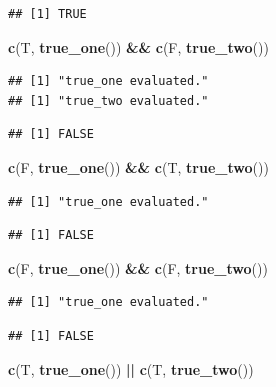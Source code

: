 \documentclass[]{book}
\newenvironment{Shaded}{\begin{snugshade}}{\end{snugshade}}
\newcommand{\KeywordTok}[1]{\textcolor[rgb]{0.13,0.29,0.53}{\textbf{#1}}}
\newcommand{\NormalTok}[1]{#1}
\newcommand{\OperatorTok}[1]{\textcolor[rgb]{0.81,0.36,0.00}{\textbf{#1}}}
\newcommand{\StringTok}[1]{\textcolor[rgb]{0.31,0.60,0.02}{#1}}
\begin{document}
\begin{verbatim}
## [1] TRUE
\end{verbatim}

\begin{Shaded}
\begin{Highlighting}[]
\KeywordTok{c}\NormalTok{(T, }\KeywordTok{true_one}\NormalTok{()) }\OperatorTok{&&}\StringTok{ }\KeywordTok{c}\NormalTok{(F, }\KeywordTok{true_two}\NormalTok{())}
\end{Highlighting}
\end{Shaded}

\begin{verbatim}
## [1] "true_one evaluated."
## [1] "true_two evaluated."
\end{verbatim}

\begin{verbatim}
## [1] FALSE
\end{verbatim}

\begin{Shaded}
\begin{Highlighting}[]
\KeywordTok{c}\NormalTok{(F, }\KeywordTok{true_one}\NormalTok{()) }\OperatorTok{&&}\StringTok{ }\KeywordTok{c}\NormalTok{(T, }\KeywordTok{true_two}\NormalTok{()) }
\end{Highlighting}
\end{Shaded}

\begin{verbatim}
## [1] "true_one evaluated."
\end{verbatim}

\begin{verbatim}
## [1] FALSE
\end{verbatim}

\begin{Shaded}
\begin{Highlighting}[]
\KeywordTok{c}\NormalTok{(F, }\KeywordTok{true_one}\NormalTok{()) }\OperatorTok{&&}\StringTok{ }\KeywordTok{c}\NormalTok{(F, }\KeywordTok{true_two}\NormalTok{()) }
\end{Highlighting}
\end{Shaded}

\begin{verbatim}
## [1] "true_one evaluated."
\end{verbatim}

\begin{verbatim}
## [1] FALSE
\end{verbatim}

\begin{Shaded}
\begin{Highlighting}[]
\KeywordTok{c}\NormalTok{(T, }\KeywordTok{true_one}\NormalTok{()) }\OperatorTok{||}\StringTok{ }\KeywordTok{c}\NormalTok{(T, }\KeywordTok{true_two}\NormalTok{())}
\end{Highlighting}
\end{Shaded}
\end{document}
